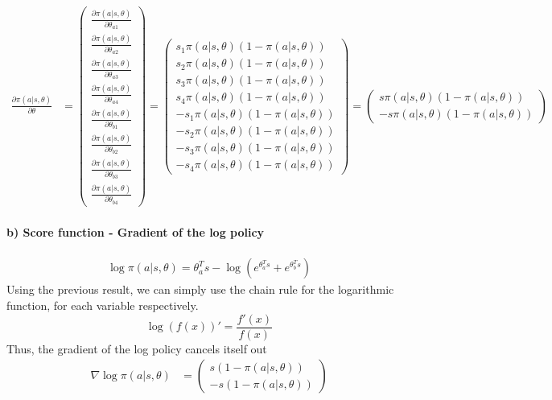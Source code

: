 \documentclass{article}
\begin{document}
\begin{align}
    \frac{\partial \pi(a|s, \theta)}{\partial \theta} &= 
    \begin{pmatrix}
        \frac{\partial \pi(a|s, \theta)}{\partial \theta_{a1}} \\
        \frac{\partial \pi(a|s, \theta)}{\partial \theta_{a2}} \\
        \frac{\partial \pi(a|s, \theta)}{\partial \theta_{a3}} \\
        \frac{\partial \pi(a|s, \theta)}{\partial \theta_{a4}} \\
        \frac{\partial \pi(a|s, \theta)}{\partial \theta_{b1}} \\
        \frac{\partial \pi(a|s, \theta)}{\partial \theta_{b2}} \\
        \frac{\partial \pi(a|s, \theta)}{\partial \theta_{b3}} \\
        \frac{\partial \pi(a|s, \theta)}{\partial \theta_{b4}}
    \end{pmatrix} =
    \begin{pmatrix}
        s_1 \pi(a|s, \theta)(1 - \pi(a|s, \theta)) \\
        s_2 \pi(a|s, \theta)(1 - \pi(a|s, \theta))  \\
        s_3 \pi(a|s, \theta)(1 - \pi(a|s, \theta))  \\
        s_4 \pi(a|s, \theta)(1 - \pi(a|s, \theta))  \\
        -s_1 \pi(a|s, \theta)(1 - \pi(a|s, \theta))  \\
        -s_2 \pi(a|s, \theta)(1 - \pi(a|s, \theta))  \\
        -s_3 \pi(a|s, \theta)(1 - \pi(a|s, \theta))  \\
        -s_4 \pi(a|s, \theta)(1 - \pi(a|s, \theta)) 
    \end{pmatrix} =
    \begin{pmatrix}
        s \pi(a|s, \theta)(1 - \pi(a|s, \theta)) \\
        -s \pi(a|s, \theta)(1 - \pi(a|s, \theta))
    \end{pmatrix}
\end{align}

\paragraph*{b) Score function - Gradient of the log policy}

\begin{align}
    \log \pi(a|s, \theta) = \theta_{a}^T s - \log (e^{\theta_a^T s} + e^{\theta_b^T s})
\end{align}
Using the previous result, we can simply use the chain rule for the logarithmic function, for each variable respectively.
\begin{equation}
    \log (f(x))' = \frac{f'(x)}{f(x)}
\end{equation}
Thus, the gradient of the log policy cancels itself out 
\begin{align}
    \nabla \log \pi(a|s, \theta) &= \begin{pmatrix}
        s(1-\pi(a|s,\theta)) \\ -s (1-\pi(a|s,\theta))
    \end{pmatrix}
\end{align}
\end{document}
